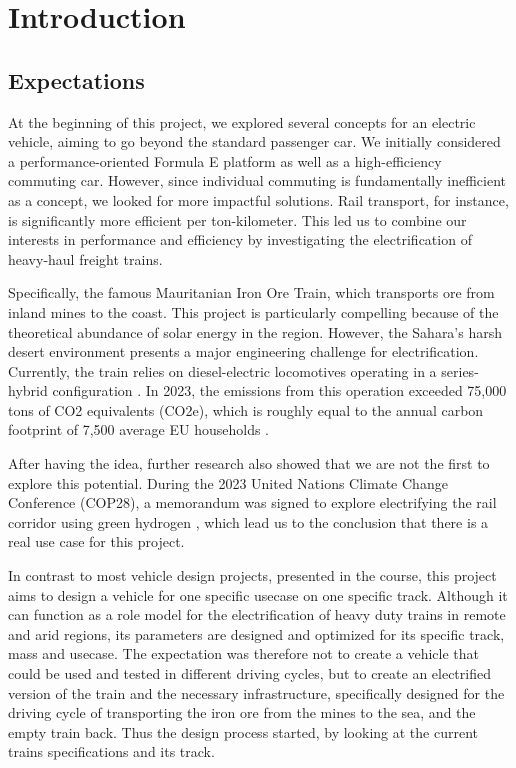 \section{Introduction}
\subsection{Expectations}
At the beginning of this project, we explored several concepts for an electric vehicle, aiming to go beyond the standard passenger car. We initially considered a performance-oriented Formula E platform as well as a high-efficiency commuting car. However, since individual commuting is fundamentally inefficient as a concept, we looked for more impactful solutions. Rail transport, for instance, is significantly more efficient per ton-kilometer. This led us to combine our interests in performance and efficiency by investigating the electrification of heavy-haul freight trains.

Specifically, the famous Mauritanian Iron Ore Train, which transports ore from inland mines to the coast. This project is particularly compelling because of the theoretical abundance of solar energy in the region. However, the Sahara’s harsh desert environment presents a major engineering challenge for electrification. Currently, the train relies on diesel-electric locomotives operating in a series-hybrid configuration \cite{SNIM2024NIES}. In 2023, the emissions from this operation exceeded 75,000 tons of CO2 equivalents (CO2e), which is roughly equal to the annual carbon footprint of 7,500 average EU households \cite{SNIM2023AnnualReport, Ivanova2017Mapping}.

 After having the idea, further research also showed that we are not the first to explore this potential. During the 2023 United Nations Climate Change Conference (COP28), a memorandum was signed to explore electrifying the rail corridor using green hydrogen \cite{SNIM2023AnnualReport}, which lead us to the conclusion that there is a real use case for this project.

In contrast to most vehicle design projects, presented in the course, this project aims to design a vehicle for one specific usecase on one specific track. Although it can function as a role model for the electrification of heavy duty trains in remote and arid regions, its parameters are designed and optimized for its specific track, mass and usecase. The expectation was therefore not to create a vehicle that could be used and tested in different driving cycles, but to create an electrified version of the train and the necessary infrastructure, specifically designed for the driving cycle of transporting the iron ore from the mines to the sea, and the empty train back. Thus the design process started, by looking at the current trains specifications and its track. 

